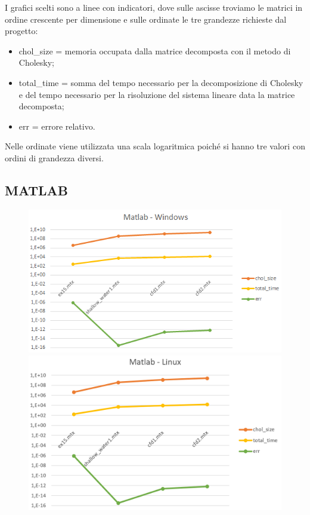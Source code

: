 \documentclass[a4paper,10pt]{article}
\begin{document}
I grafici scelti sono a linee con indicatori, dove sulle ascisse troviamo le matrici in ordine crescente per dimensione e sulle ordinate le tre grandezze richieste dal progetto:
\begin{itemize}
\item chol\_size = memoria occupata dalla matrice decomposta con il metodo di Cholesky;
\item total\_time = somma del tempo necessario per la decomposizione di Cholesky e del tempo necessario per la risoluzione del sistema lineare data la matrice decomposta;
\item err = errore relativo.
\end{itemize}
Nelle ordinate viene utilizzata una scala logaritmica poiché si hanno tre valori con ordini di grandezza diversi.
 

\subsection{MATLAB}


\begin{figure}[H]
\centering
\begin{minipage}{.6\textwidth}
  \centering
  \includegraphics[width=1\linewidth]{img/matlabwin.png}
\end{minipage}%
\begin{minipage}{.6\textwidth}
  \centering
  \includegraphics[width=1\linewidth]{img/matlablinux.png}
\end{minipage}
\end{figure}
\end{document}
